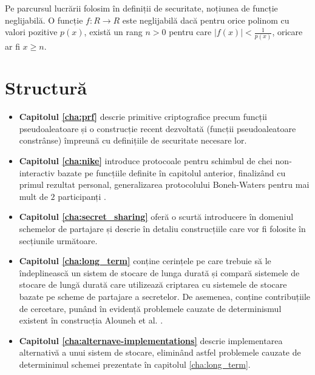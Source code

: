 \documentclass[oneside, 12pt]{book}
\begin{document}
Pe parcursul lucrării folosim în definiții de securitate, noțiunea de funcție neglijabilă. O funcție $f : R \rightarrow R$ este neglijabilă dacă pentru orice polinom cu valori pozitive $p(x)$, există un rang $n > 0$ pentru care $|f(x)| < \frac{1}{p(x)}$, oricare ar fi $x \geq n$.






\chapter*{Structură}

\begin{itemize}
	\item \textbf{Capitolul \ref{cha:prf}} descrie primitive criptografice precum funcții pseudoaleatoare și o construcție recent dezvoltată (funcții pseudoaleatoare constrânse) împreună cu definițiile de securitate necesare lor.
	\item \textbf{Capitolul \ref{cha:nike}} introduce protocoale pentru schimbul de chei non-interactiv bazate pe funcțiile definite în capitolul anterior, finalizând cu primul rezultat personal, generalizarea protocolului Boneh-Waters pentru mai mult de $2$ participanți \cite{RD:2014}.
	\item \textbf{Capitolul \ref{cha:secret_sharing}} oferă o scurtă introducere în domeniul schemelor de partajare și descrie în detaliu construcțiile care vor fi folosite în secțiunile următoare.
	\item \textbf{Capitolul \ref{cha:long_term}} conține cerințele pe care trebuie să le îndeplinească un sistem de stocare de lunga durată și compară sistemele de stocare de lungă durată care utilizează criptarea cu sistemele de stocare bazate pe scheme de partajare a secretelor. De asemenea, conține contribuțiile de cercetare, punând în evidență problemele cauzate de determinismul existent în construcția Alouneh et al. \cite{AAMK:2013}.
	\item \textbf{Capitolul \ref{cha:alternave-implementations}} descrie implementarea alternativă a unui sistem de stocare, eliminând astfel problemele cauzate de determinimul schemei prezentate în capitolul \ref{cha:long_term}.
\end{itemize}
\end{document}
